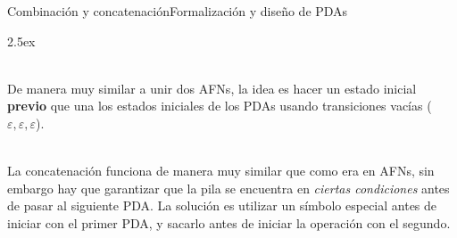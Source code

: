 \documentclass[spanish]{beamer}
\begin{document}
\begin{frame}{Combinación y concatenación}{Formalización y diseño de PDAs}
    \begin{description}
        \itemsep2.5ex
        \item[Combinación de PDAs] \hfill \\
        De manera muy similar a unir dos AFNs, la idea es hacer un estado inicial \textbf{previo} que una los estados iniciales de los PDAs usando transiciones vacías ($\varepsilon,\varepsilon,\varepsilon$). \pause
        \item[Concatenación de PDAs]  \hfill \\
        La concatenación funciona de manera muy similar que como era en AFNs, sin embargo hay que garantizar que la pila se encuentra en \textit{ciertas condiciones} antes de pasar al siguiente PDA.
        La solución es utilizar un símbolo especial antes de iniciar con el primer PDA, y sacarlo antes de iniciar la operación con el segundo.
    \end{description}
    
\end{frame}

% 
% 
\end{document}
